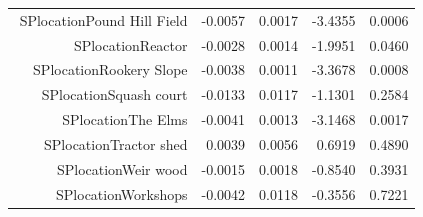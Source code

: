 \begin{table}[ht]
\begin{tabular}{rrrrr}
$$  SPlocationPound Hill Field & -0.0057 & 0.0017 & -3.4355 & 0.0006 \\ 
  SPlocationReactor & -0.0028 & 0.0014 & -1.9951 & 0.0460 \\ 
  SPlocationRookery Slope & -0.0038 & 0.0011 & -3.3678 & 0.0008 \\ 
  SPlocationSquash court & -0.0133 & 0.0117 & -1.1301 & 0.2584 \\ 
  SPlocationThe Elms & -0.0041 & 0.0013 & -3.1468 & 0.0017 \\ 
  SPlocationTractor shed & 0.0039 & 0.0056 & 0.6919 & 0.4890 \\ 
  SPlocationWeir wood & -0.0015 & 0.0018 & -0.8540 & 0.3931 \\ 
  SPlocationWorkshops & -0.0042 & 0.0118 & -0.3556 & 0.7221 \\ 
   \hline
\end{tabular}
\end{table}
